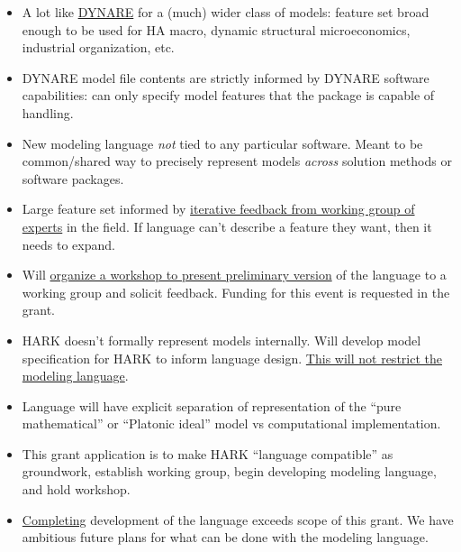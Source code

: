 \documentclass[12pt,pdftex,letterpaper]{article}
\begin{document}
\begin{itemize}
	\item A lot like \href{https://www.dynare.org/}{DYNARE} for a (much) wider class of models: feature set broad enough to be used for HA macro, dynamic structural microeconomics, industrial organization, etc.
	
	\item DYNARE model file contents are strictly informed by DYNARE software capabilities: can only specify model features that the package is capable of handling.
	
	\item New modeling language \textit{not} tied to any particular software. Meant to be common/shared way to precisely represent models \textit{across} solution methods or software packages.
	
	\item Large feature set informed by \underline{iterative feedback from working group of experts} in the field. If language can't describe a feature they want, then it needs to expand.
	
	\item Will \underline{organize a workshop to present preliminary version} of the language to a working group and solicit feedback. Funding for this event is requested in the grant.
	
	\item HARK doesn't formally represent models internally. Will develop model specification for HARK to inform language design. \underline{This will not restrict the modeling language}.
	
	\item Language will have explicit separation of representation of the ``pure mathematical'' or ``Platonic ideal'' model vs computational implementation.%
	
	\item This grant application is to make HARK ``language compatible'' as groundwork, establish working group, begin developing modeling language, and hold workshop.
	
	\item \underline{Completing} development of the language exceeds scope of this grant. We have ambitious future plans for what can be done with the modeling language.
	
	

\end{itemize}
\end{document}
